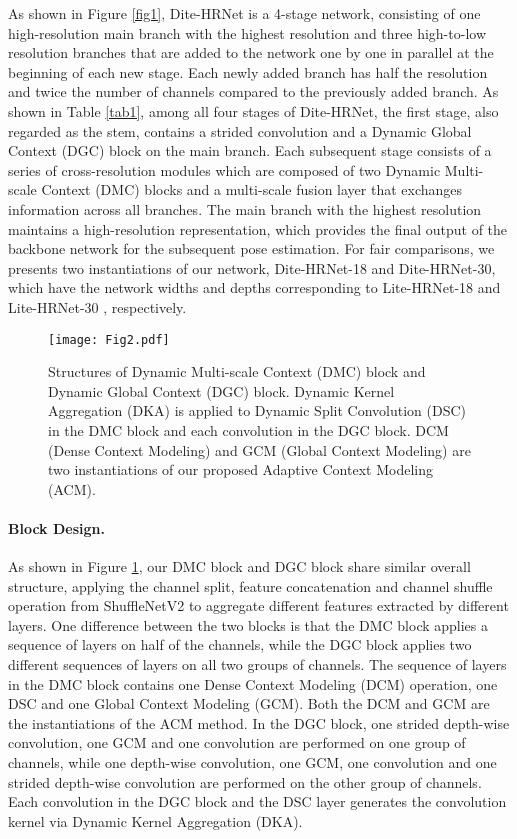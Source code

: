 \documentclass{article}
\begin{document}
As shown in Figure \ref{fig1}, Dite-HRNet is a 4-stage network, consisting of one high-resolution main branch with the highest resolution and three high-to-low resolution branches that are added to the network one by one in parallel at the beginning of each new stage. Each newly added branch has half the resolution and twice the number of channels compared to the previously added branch. As shown in Table \ref{tab1}, among all four stages of Dite-HRNet, the first stage, also regarded as the stem, contains a  strided convolution and a Dynamic Global Context (DGC) block on the main branch. Each subsequent stage consists of a series of cross-resolution modules which are composed of two Dynamic Multi-scale Context (DMC) blocks and a multi-scale fusion layer that exchanges information across all branches. The main branch with the highest resolution maintains a high-resolution representation, which provides the final output of the backbone network for the subsequent pose estimation. For fair comparisons, we presents two instantiations of our network, Dite-HRNet-18 and Dite-HRNet-30, which have the network widths and depths corresponding to Lite-HRNet-18 \cite{yu:litehrnet} and Lite-HRNet-30 \cite{yu:litehrnet}, respectively.



\begin{figure}[t]
\centering
\texttt{[image: Fig2.pdf]}
\caption{Structures of Dynamic Multi-scale Context (DMC) block and Dynamic Global Context (DGC) block. Dynamic Kernel Aggregation (DKA) is applied to Dynamic Split Convolution (DSC) in the DMC block and each convolution in the DGC block. DCM (Dense Context Modeling) and GCM (Global Context Modeling) are two instantiations of our proposed Adaptive Context Modeling (ACM).}
\label{fig2}
\end{figure}

\paragraph{Block Design.} As shown in Figure \ref{fig2}, our DMC block and DGC block share similar overall structure, applying the channel split, feature concatenation and channel shuffle operation from ShuffleNetV2 \cite{ma:shuffle2} to aggregate different features extracted by different layers. One difference between the two blocks is that the DMC block applies a sequence of layers on half of the channels, while the DGC block applies two different sequences of layers on all two groups of channels. The sequence of layers in the DMC block contains one Dense Context Modeling (DCM) operation, one DSC and one Global Context Modeling (GCM). Both the DCM and GCM are the instantiations of the ACM method. In the DGC block, one  strided depth-wise convolution, one GCM and one  convolution are performed on one group of channels, while one  depth-wise convolution, one GCM, one  convolution and one  strided depth-wise convolution are performed on the other group of channels. Each convolution in the DGC block and the DSC layer generates the convolution kernel via Dynamic Kernel Aggregation (DKA).
\end{document}
